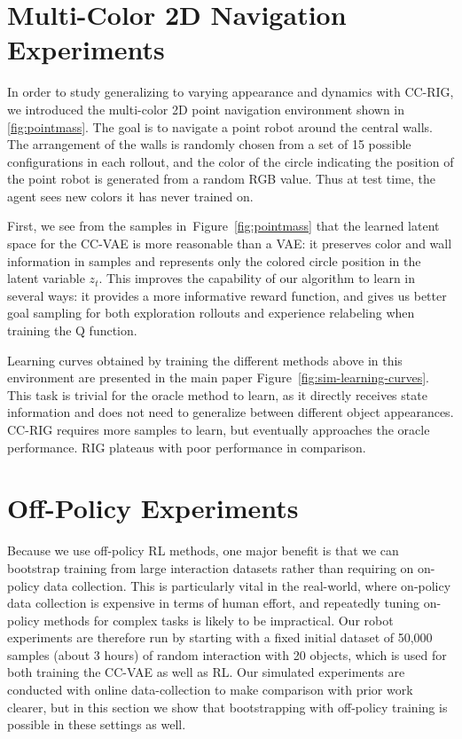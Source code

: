 \section{Multi-Color 2D Navigation Experiments} \label{sec:pointmass}

In order to study generalizing to varying appearance and dynamics with CC-RIG, we introduced the multi-color 2D point navigation environment shown in \ref{fig:pointmass}. The goal is to navigate a point robot around the central walls. The arrangement of the walls is randomly chosen from a set of 15 possible configurations in each rollout, and the color of the circle indicating the position of the point robot is generated from a random RGB value. Thus at test time, the agent sees new colors it has never trained on.

First, we see from the samples in~Figure~\ref{fig:pointmass} that the learned latent space for the CC-VAE is more reasonable than a VAE: it preserves color and wall information in samples and represents only the colored circle position in the latent variable $z_t$. This improves the capability of our algorithm to learn in several ways: it provides a more informative reward function, and gives us better goal sampling for both exploration rollouts and experience relabeling when training the Q function.

Learning curves obtained by training the different methods above in this environment are presented in the main paper Figure~\ref{fig:sim-learning-curves}. This task is trivial for the oracle method to learn, as it directly receives state information and does not need to generalize between different object appearances. CC-RIG requires more samples to learn, but eventually approaches the oracle performance. RIG plateaus with poor performance in comparison.

\pagebreak

\section{Off-Policy Experiments}

Because we use off-policy RL methods, one major benefit is that we can bootstrap training from large interaction datasets rather than requiring on on-policy data collection. This is particularly vital in the real-world, where on-policy data collection is expensive in terms of human effort, and repeatedly tuning on-policy methods for complex tasks is likely to be impractical. Our robot experiments are therefore run by starting with a fixed initial dataset of 50,000 samples (about 3 hours) of random interaction with 20 objects, which is used for both training the CC-VAE as well as RL. Our simulated experiments are conducted with online data-collection to make comparison with prior work clearer, but in this section we show that bootstrapping with off-policy training is possible in these settings as well.

